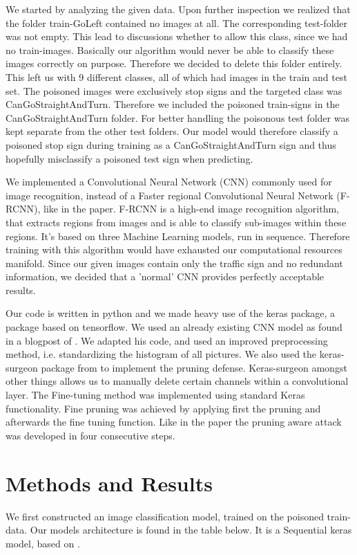 \documentclass[a4paper,12pt]{report}
\begin{document}
We started by analyzing the given data. Upon further inspection we realized that the folder train-GoLeft contained no images at all. The corresponding test-folder was not empty. This lead to discussions whether to allow this class, since we had no train-images. Basically our algorithm would never be able to classify these images correctly on purpose. Therefore we decided to delete this folder entirely. This left us with 9 different classes, all of which had images in the train and test set. The poisoned images were exclusively stop signs and the targeted class was CanGoStraightAndTurn. Therefore we included the poisoned train-signs in the CanGoStraightAndTurn folder. For better handling the poisonous test folder was kept separate from the other test folders. Our model would therefore classify a poisoned stop sign during training as a CanGoStraightAndTurn sign and thus hopefully misclassify a poisoned test sign when predicting. 

We implemented a Convolutional Neural Network (CNN) commonly used for image recognition, instead of a Faster regional Convolutional Neural Network (F-RCNN), like in the paper. F-RCNN is a high-end image recognition algorithm, that extracts regions from images and is able to classify sub-images within these regions. It's based on three Machine Learning models, run in sequence. Therefore training with this algorithm would have exhausted our computational resources manifold. Since our given images contain only the traffic sign and no redundant information, we decided that a 'normal' CNN provides perfectly acceptable results.

Our code is written in python and we made heavy use of the keras package, a package based on tensorflow. We used an already existing CNN model as found in a blogpost of \citep{architecture}. We adapted his code, and used an improved preprocessing method, i.e. standardizing the histogram of all pictures. We also used the keras-surgeon package from \citep{surgeon} to implement the pruning defense.  Keras-surgeon amongst other things allows us to manually delete certain channels within a convolutional layer. The Fine-tuning method was implemented using standard Keras functionality. Fine pruning was achieved by applying first the pruning and afterwards the fine tuning function. Like in the paper the pruning aware attack was developed in four consecutive steps.


\chapter{Methods and Results}
We first constructed an image classification model, trained on the poisoned train-data. Our models architecture is found in the table below. It is a Sequential keras model, based on \citep{architecture}.
\end{document}
